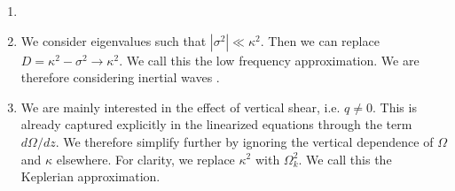 \begin{enumerate}
  
\item%





  
  
\item We consider eigenvalues such that
  $|\sigma^2|\ll \kappa^2$. Then we can replace $D=\kappa^2 -\sigma^2\to
  \kappa^2$. %
  We call this the low frequency approximation. We are therefore
  considering inertial waves \citep{barker15}. 

\item We are mainly interested in the effect of vertical shear, i.e. $q\neq
  0$. This is already captured explicitly in the linearized equations through
  the term $d\Omega/dz$. We therefore simplify 
  further by ignoring the vertical dependence of $\Omega$ and $\kappa$
  elsewhere. For clarity, we replace $\kappa^2$ with
  $\Omega_k^2$. We call this the Keplerian approximation. 
  
\end{enumerate}




